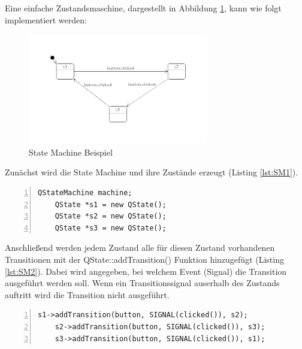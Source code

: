 Eine einfache Zustandsmaschine, dargestellt in Abbildung \ref{fig:StateMachineexample}, kann wie folgt implementiert werden:

\begin{figure}[htb]
    \centering
    \includegraphics[width=0.7\textwidth]{Abbildungen/statemachinebutton.png}
    \caption[State Machine Beispiel \newline Quelle: \textit{https://doc.qt.io/qt-5/statemachine-api.html}]{State Machine Beispiel}		
    \label{fig:StateMachineexample}
\end{figure}

Zunächst wird die State Machine und ihre Zustände erzeugt (Listing \ref{lst:SM1}). 

\begin{lstlisting}[frame=single, breaklines=true, numbers=left, stepnumber=2, firstnumber=1, numberstyle = \tiny, caption=State Machine Beispiel Teil 1 ,label=lst:SM1]
    QStateMachine machine;
    QState *s1 = new QState();
    QState *s2 = new QState();
    QState *s3 = new QState();
\end{lstlisting}

Anschließend werden jedem Zustand alle für diesen Zustand vorhandenen Transitionen mit der QState::addTransition() Funktion hinzugefügt (Listing \ref{lst:SM2}). Dabei wird angegeben, bei welchem Event (Signal) die Transition ausgeführt werden soll. Wenn ein Transitionssignal auserhalb des Zustands auftritt wird die Transition nicht ausgeführt. 

\begin{lstlisting}[frame=single, breaklines=true, numbers=left, stepnumber=2, firstnumber=1, numberstyle = \tiny, caption=State Machine Beispiel Teil 2 ,label=lst:SM2]
    s1->addTransition(button, SIGNAL(clicked()), s2);
    s2->addTransition(button, SIGNAL(clicked()), s3);
    s3->addTransition(button, SIGNAL(clicked()), s1);
\end{lstlisting}

